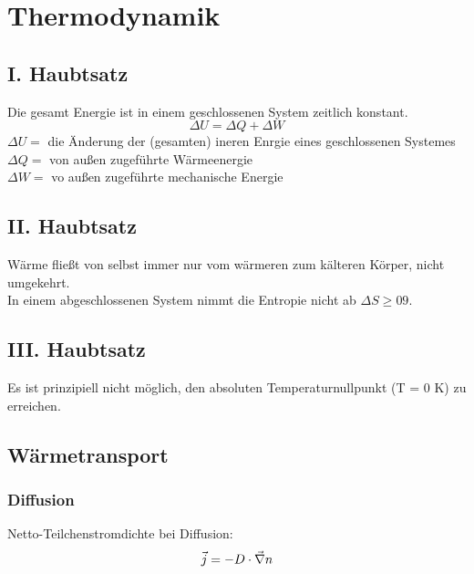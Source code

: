 \documentclass[11pt,letterpaper]{article}
\begin{document}
{
 
 \maketitle
   
 \tableofcontents

\section{Thermodynamik}{
 \subsection{I. Haubtsatz}
 {
    Die gesamt Energie ist in einem geschlossenen System zeitlich konstant.
    \begin{equation*}
        \Delta U = \Delta Q + \Delta W
    \end{equation*} 
    $\Delta U =$ die Änderung der (gesamten) ineren Enrgie eines geschlossenen Systemes\\
    $\Delta Q =$ von außen zugeführte Wärmeenergie\\
    $\Delta W =$ vo außen zugeführte mechanische Energie\\ 
 }

 \subsection{II. Haubtsatz}
 {
    Wärme fließt von selbst immer nur vom wärmeren zum kälteren Körper, nicht
    umgekehrt.\\
    In einem abgeschlossenen System nimmt die Entropie nicht ab $\Delta S \ge09$.
 }

 \subsection{III. Haubtsatz}
 {
    Es ist prinzipiell nicht möglich, den absoluten Temperaturnullpunkt (T = 0 K)
    zu erreichen.
 }

\subsection{Wärmetransport}
{
    \subsubsection{Diffusion}
    {
        Netto-Teilchenstromdichte bei Diffusion:
        \begin{equation*}
            \vec{j} = -D\cdot \vec{\nabla}n\\
        \end{equation*}
    }
}}}
\end{document}
